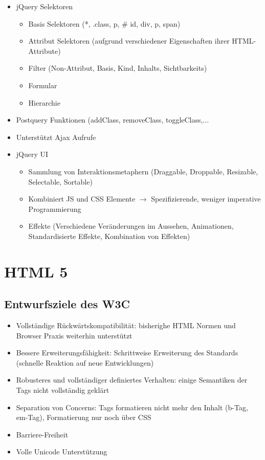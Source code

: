 \documentclass{article} %
\begin{document}
\begin{itemize}
\begin{itemize}
			\end{itemize}
			\item jQuery Selektoren
			\begin{itemize}
				\item Basis Selektoren (*, .class, p, \# id, div, p, span)
				\item Attribut Selektoren (aufgrund verschiedener Eigenschaften ihrer HTML-Attribute)
				\item Filter (Non-Attribut, Basis, Kind, Inhalts, Sichtbarkeits)
				\item Formular
				\item Hierarchie
			\end{itemize}
			\item Postquery Funktionen (addClass, removeClass, toggleClass,...
			\item Unterstützt Ajax Aufrufe
			\item jQuery UI
			\begin{itemize}
				\item Sammlung von Interaktionsmetaphern (Draggable, Droppable, Resizable, Selectable, Sortable)
				\item Kombiniert JS und CSS Elemente $\rightarrow$ Spezifizierende, weniger imperative Programmierung
				\item Effekte (Verschiedene Veränderungen im Aussehen, Animationen, Standardisierte Effekte, Kombination von Effekten)
			\end{itemize}
		\end{itemize}		
\section{HTML 5}
	\subsection{Entwurfsziele des W3C }
	\begin{itemize}
		\item Vollständige Rückwärtskompatibilität: bisherighe HTML Normen und Browser Praxis weiterhin unterstützt
		\item Bessere Erweiterungsfähigkeit: Schrittweise Erweiterung des Standards (schnelle Reaktion auf neue Entwicklungen)
		\item Robusteres und vollständiger definiertes Verhalten: einige Semantiken der Tags nicht vollständig geklärt
		\item Separation von Concerns: Tags formatieren nicht mehr den Inhalt (b-Tag, em-Tag), Formatierung nur noch über CSS
		\item Barriere-Freiheit
		\item Volle Unicode Unterstützung
	\end{itemize}
\end{document}
